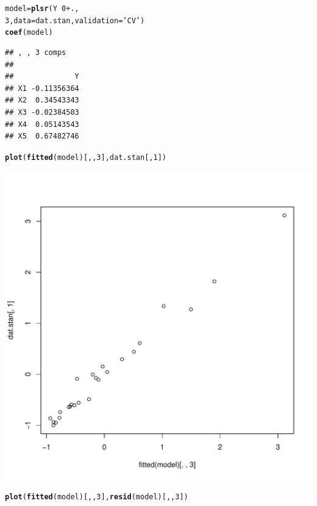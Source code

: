 \documentclass{article}\usepackage[]{graphicx}\usepackage[]{color}
\makeatletter
\def\maxwidth{ %
  \ifdim\Gin@nat@width>\linewidth
    \linewidth
  \else
    \Gin@nat@width
  \fi
}
\newcommand{\hlnum}[1]{\textcolor[rgb]{0.686,0.059,0.569}{#1}}%
\newcommand{\hlstr}[1]{\textcolor[rgb]{0.192,0.494,0.8}{#1}}%
\newcommand{\hlopt}[1]{\textcolor[rgb]{0,0,0}{#1}}%
\newcommand{\hlstd}[1]{\textcolor[rgb]{0.345,0.345,0.345}{#1}}%
\newcommand{\hlkwb}[1]{\textcolor[rgb]{0.69,0.353,0.396}{#1}}%
\newcommand{\hlkwc}[1]{\textcolor[rgb]{0.333,0.667,0.333}{#1}}%
\newcommand{\hlkwd}[1]{\textcolor[rgb]{0.737,0.353,0.396}{\textbf{#1}}}%
\newenvironment{kframe}{%
 \def\at@end@of@kframe{}%
 \ifinner\ifhmode%
  \def\at@end@of@kframe{\end{minipage}}%
  \begin{minipage}{\columnwidth}%
 \fi\fi%
 \def\FrameCommand##1{\hskip\@totalleftmargin \hskip-\fboxsep
 \colorbox{shadecolor}{##1}\hskip-\fboxsep
     \hskip-\linewidth \hskip-\@totalleftmargin \hskip\columnwidth}%
 \MakeFramed {\advance\hsize-\width
   \@totalleftmargin\z@ \linewidth\hsize
   \@setminipage}}%
 {\par\unskip\endMakeFramed%
 \at@end@of@kframe}
\newenvironment{knitrout}{}{} %
\makeatother
\begin{document}
\begin{enumerate}[(a)]
\begin{knitrout}
\color{fgcolor}\begin{kframe}
\begin{alltt}
  \hlstd{model} \hlkwb{=} \hlkwd{plsr}\hlstd{(Y} \hlopt{~} \hlnum{0} \hlopt{+} \hlstd{.,}
               \hlnum{3}\hlstd{,} \hlkwc{data} \hlstd{= dat.stan,} \hlkwc{validation} \hlstd{=} \hlstr{'CV'}\hlstd{)}
  \hlkwd{coef}\hlstd{(model)}
\end{alltt}
\begin{verbatim}
## , , 3 comps
## 
##              Y
## X1 -0.11356364
## X2  0.34543343
## X3 -0.02384503
## X4  0.05143543
## X5  0.67482746
\end{verbatim}
\begin{alltt}
  \hlkwd{plot}\hlstd{(}\hlkwd{fitted}\hlstd{(model)[,,}\hlnum{3}\hlstd{], dat.stan[,}\hlnum{1}\hlstd{])}
\end{alltt}
\end{kframe}
\includegraphics[width=\maxwidth]{figure/unnamed-chunk-7-1} 
\begin{kframe}\begin{alltt}
  \hlkwd{plot}\hlstd{(}\hlkwd{fitted}\hlstd{(model)[,,}\hlnum{3}\hlstd{],} \hlkwd{resid}\hlstd{(model)[,,}\hlnum{3}\hlstd{])}
\end{alltt}
\end{kframe}

\end{knitrout}
\end{enumerate}
\end{document}
